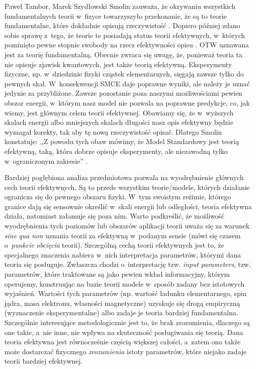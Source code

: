 \begin{artplenv2auth}{Paweł Tambor, Marek Szydłowski}
Smolin zauważa, że okrywaniu wszystkich fundamentalnych teorii w~fizyce towarzyszyło przekonanie, że są to teorie fundamentalne, które dokładnie opisują rzeczywistość
\parencite[][s.~163–167]{smolin_czas_2015}. %
 Dopiero później zdano sobie sprawę z~tego, że teorie te posiadają status teorii efektywnych, w~których pominięto pewne stopnie swobody na rzecz efektywności opisu 
\parencite[][]{wilson_non-reductive_2010}. %
 OTW uznawana jest za teorię fundamentalną. Obecnie zwraca się uwagę, że, ponieważ teoria ta nie opisuje zjawisk kwantowych, jest także teorią efektywną. Eksperymenty fizyczne, np. w~dziedzinie fizyki cząstek elementarnych, sięgają zawsze tylko do pewnych skal. W~konsekwencji SMCE daje poprawne wyniki, ale należy je uznać jedynie za przybliżone. Zawsze pozostanie poza naszymi możliwościami pewien obszar energii, w~którym nasz model nie pozwala na poprawne predykcje, co, jak wiemy, jest głównym celem teorii efektywnej. Obawiamy się, że w~wyższych skalach energii albo mniejszych skalach długości nasz opis efektywny będzie wymagał korekty, tak aby tę nową rzeczywistość opisać. Dlatego Smolin konstatuje: ,,Z powodu tych obaw mówimy, że Model Standardowy jest teorią efektywną, taką, która dobrze opisuje eksperymenty, ale niezawodną tylko w~ograniczonym zakresie'' 
\parencite[][s.~164]{smolin_czas_2015}.%


Bardziej pogłębiona analiza przedmiotowa pozwala na wyodrębnienie głównych cech teorii efektywnych. Są to przede wszystkim teorie/modele, których działanie ogranicza się do pewnego obszaru fizyki. W~tym swoistym reżimie, którego granice dają się sensownie określić w~skali energii lub odległości, teoria efektywna działa, natomiast załamuje się poza nim. Warto podkreślić, że możliwość wyodrębnienia tych poziomów lub obszarów aplikacji teorii uważa się za warunek \textit{sine qua non} uznania teorii za efektywną w~podanym sensie (mówi się czasem o~\textit{punkcie} \textit{obcięcia} teorii). Szczególną cechą teorii efektywnych jest to, że specjalnego znaczenia nabiera w~nich interpretacja parametrów, którymi dana teoria się posługuje. Zwłaszcza chodzi o~interpretację tzw. \textit{input parameters}, tzw. parametrów, które traktowane są jako pewien wkład informacyjny, którym operujemy, konstruując na bazie teorii modele w~sposób zadany bez istotowych wyjaśnień. Wartości tych parametrów (np. wartość ładunku elementarnego, spin jądra, masa elektronu, własności magnetyczne) uzyskuje się drogą empiryczną (wyznaczenie eksperymentalne) albo zadaje je teoria bardziej fundamentalna. Szczególnie interesujące metodologicznie jest to, że brak zrozumienia, dlaczego są one takie, a~nie inne, nie wpływa na skuteczność posługiwania się teorią. Dana teoria efektywna jest równocześnie częścią większej całości, a~zatem ona także może dostarczać fizycznego \textit{zrozumienia} istoty parametrów, które niejako zadaje teorii bardziej efektywnej.


\end{artplenv2auth}
